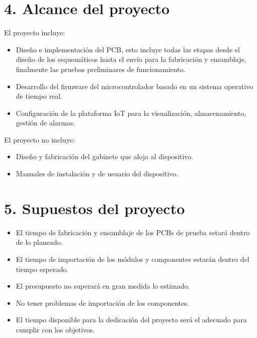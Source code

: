 \documentclass[
11pt, %
codirector, %
]{charter}
\begin{document}
\section{4. Alcance del proyecto}
\label{sec:alcance}
El proyecto incluye:
\begin{itemize}
	\item Diseño e implementación del PCB, esto incluye todas las etapas desde el diseño de los esquemáticos hasta el envío para la fabricación y ensamblaje, finalmente las pruebas preliminares de funcionamiento.
	\item Desarrollo del firmware del microcontrolador basado en un sistema operativo de tiempo real.
	\item Configuración de la plataforma IoT para la visualización, almacenamiento, gestión de alarmas.
\end{itemize}
El proyecto no incluye:
\begin{itemize}
	\item Diseño y fabricación del gabinete que aloja al dispositivo.
	\item Manuales de instalación y de usuario del dispositivo.
\end{itemize}

\section{5. Supuestos del proyecto}
\label{sec:supuestos}

\begin{itemize}
	\item El tiempo de fabricación y ensamblaje de los PCBs de prueba estará dentro de lo planeado.
	\item El tiempo de importación de los módulos y componentes estarán dentro del tiempo esperado.
	\item El presupuesto no superará en gran medida lo estimado.
	\item No tener problemas de importación de los componentes.
	\item El tiempo disponible para la dedicación del proyecto será el adecuado para cumplir con
	los objetivos.
 
\end{itemize}
\end{document}

